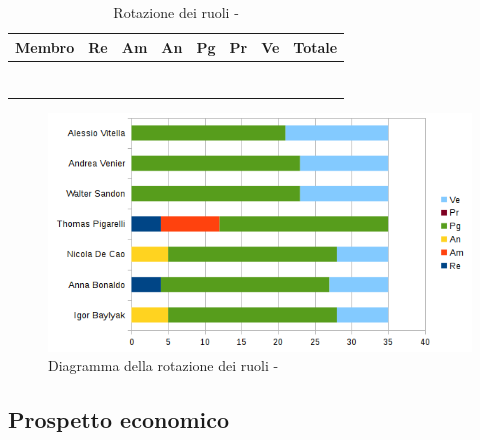 \documentclass[12pt,a4paper]{article}
\begin{document}
\begin{table}[h]
	\begin{center}
		\begin{tabular}{l r r r r r r r}
			\toprule
			\textbf{Membro}	&	\textbf{Re}	&	\textbf{Am}	& \textbf{An} & \textbf{Pg} & \textbf{Pr} & \textbf{Ve} & \textbf{Totale}\\
			\midrule
			\midrule
			\IB &  &  &  &  &  &  &  \\
			\midrule
			\AB &  &  &  &  &  &  &  \\
			\midrule
			\NDC &  &  &  &  &  &  &  \\
			\midrule
			\TP &  &  &  &  &  &  &  \\
			\midrule
			\WS &  &  &  &  &  &  &  \\
			\midrule
			\AVE &  &  &  &  &  &  &  \\
			\midrule
			\AVI &  &  &  &  &  &  &  \\
			\bottomrule
		\end{tabular}
		\caption{Rotazione dei ruoli - \FA}
	\end{center}
\end{table}

\begin{center}
	\begin{figure}[H]
		\centering		\includegraphics[width=\textwidth]{diagrammaBarreProgettazioneArchitetturaleRotazioneRuoli.png}
		\caption{Diagramma della rotazione dei ruoli - \FPA}
	\end{figure}
\end{center}

\subsection{Prospetto economico}
\end{document}
